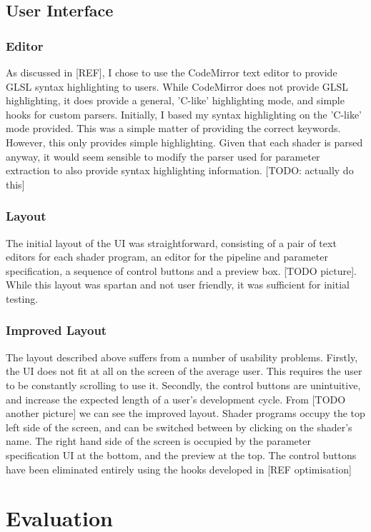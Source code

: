 \documentclass[12pt,twoside,notitlepage]{report}
\begin{document}
\section{User Interface}
\subsection{Editor}
As discussed in [REF], I chose to use the CodeMirror text editor to provide GLSL syntax highlighting to users. While CodeMirror does not provide GLSL highlighting, it does provide a general, 'C-like' highlighting mode, and simple hooks for custom parsers. Initially, I based my syntax highlighting on the 'C-like' mode provided. This was a simple matter of providing the correct keywords. However, this only provides simple highlighting. Given that each shader is parsed anyway, it would seem sensible to modify the parser used for parameter extraction to also provide syntax highlighting information. [TODO: actually do this]

\subsection{Layout}
The initial layout of the UI was straightforward, consisting of a pair of text editors for each shader program, an editor for the pipeline and parameter specification, a sequence of control buttons and a preview box. [TODO picture]. While this layout was spartan and not user friendly, it was sufficient for initial testing.
\subsection{Improved Layout}
The layout described above suffers from a number of usability problems. Firstly, the UI does not fit at all on the screen of the average user. This requires the user to be constantly scrolling to use it. Secondly, the control buttons are unintuitive, and increase the expected length of a user's development cycle. From [TODO another picture] we can see the improved layout. Shader programs occupy the top left side of the screen, and can be switched between by clicking on the shader's name. The right hand side of the screen is occupied by the parameter specification UI at the bottom, and the preview at the top. The control buttons have been eliminated entirely using the hooks developed in [REF optimisation]

\cleardoublepage
\chapter{Evaluation}
\end{document}

